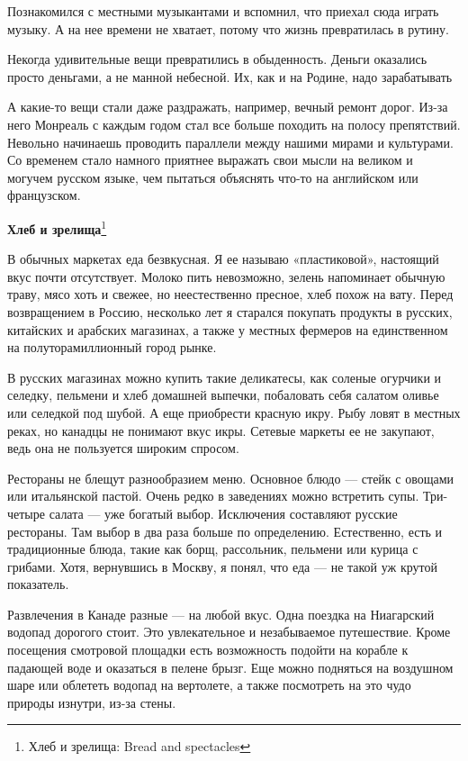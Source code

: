 Познакомился с местными музыкантами и вспомнил, что приехал сюда играть музыку. А на нее времени не хватает, потому что жизнь превратилась в рутину.

\begin{fancyquotes}
    Некогда удивительные вещи превратились в обыденность. Деньги оказались просто деньгами, а не манной небесной. Их, как и на Родине, надо зарабатывать
\end{fancyquotes}

А какие-то вещи стали даже раздражать, например, вечный ремонт дорог. Из-за него Монреаль с каждым годом стал все больше походить на полосу препятствий. Невольно начинаешь проводить параллели между нашими мирами и культурами. Со временем стало намного приятнее выражать свои мысли на великом и могучем русском языке, чем пытаться объяснять что-то на английском или французском.

\textbf{Хлеб и зрелища}\footnote{Хлеб и зрелища: Bread and spectacles}

В обычных маркетах еда безвкусная. Я ее называю «пластиковой», настоящий вкус почти отсутствует. Молоко пить невозможно, зелень напоминает обычную траву, мясо хоть и свежее, но неестественно пресное, хлеб похож на вату. Перед возвращением в Россию, несколько лет я старался покупать продукты в русских, китайских и арабских магазинах, а также у местных фермеров на единственном на полуторамиллионный город рынке.

В русских магазинах можно купить такие деликатесы, как соленые огурчики и селедку, пельмени и хлеб домашней выпечки, побаловать себя салатом оливье или селедкой под шубой. А еще приобрести красную икру. Рыбу ловят в местных реках, но канадцы не понимают вкус икры. Сетевые маркеты ее не закупают, ведь она не пользуется широким спросом.

Рестораны не блещут разнообразием меню. Основное блюдо — стейк с овощами или итальянской пастой. Очень редко в заведениях можно встретить супы. Три-четыре салата — уже богатый выбор. Исключения составляют русские рестораны. Там выбор в два раза больше по определению. Естественно, есть и традиционные блюда, такие как борщ, рассольник, пельмени или курица с грибами. Хотя, вернувшись в Москву, я понял, что еда — не такой уж крутой показатель.

Развлечения в Канаде разные — на любой вкус. Одна поездка на Ниагарский водопад дорогого стоит. Это увлекательное и незабываемое путешествие. Кроме посещения смотровой площадки есть возможность подойти на корабле к падающей воде и оказаться в пелене брызг. Еще можно подняться на воздушном шаре или облететь водопад на вертолете, а также посмотреть на это чудо природы изнутри, из-за стены.


